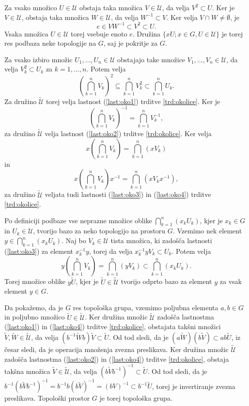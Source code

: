 \documentclass[mat1]{fmfdelo}
\newcommand{\Ucurl}{\mathcal{U}}
\begin{document}
\begin{dokaz}
Za vsako množico $U \in \Ucurl$ obstaja taka množica $V \in \Ucurl$, da velja $V^2 \subset U$. Ker je $V \in \Ucurl$, obstaja taka množica $W \in \Ucurl$, da velja $W^{-1} \subset V$. Ker velja $V \cap W \neq \emptyset$, je
\[ e \in VW^{-1} \subset V^2 \subset U. \]
Vsaka množica $U \in \Ucurl$ torej vsebuje enoto $e$.
Družina $\lbrace xU ; x \in G, U \in \Ucurl \rbrace$ je torej res podbaza neke topologije na $G$, saj je pokritje za $G$.

Za vsako izbiro množic $U_1,\dots,U_n \in \Ucurl$ obstajajo take množice $V_1,\dots,V_n \in \Ucurl$, da velja $V_k^2 \subset U_k$ za $k = 1,\dots,n$. Potem velja
\[ \left( \bigcap_{k=1}^n V_k \right)^2 \subseteq \bigcap_{k=1}^n V_k^2 \subset \bigcap_{k=1}^n U_k. \]
Za družino $\widetilde{\Ucurl}$ torej velja lastnost (\ref{last:oko1}) trditve \ref{trd:okolice}.
Ker je \[\left( \bigcap_{k=1}^n V_k \right)^{-1} = \bigcap_{k=1}^n V_k^{-1},\] za družino $\widetilde{\Ucurl}$ velja lastnost (\ref{last:oko2}) trditve \ref{trd:okolice}.
Ker velja \[x\left(\bigcap_{k=1}^n V_k\right) = \bigcap_{k=1}^n (xV_k)\]
in \[ x\left(\bigcap_{k=1}^n V_k\right)x^{-1} = \bigcap_{k=1}^n (xV_kx^{-1}), \]
za družino $\widetilde{\Ucurl}$ veljata tudi lastnosti (\ref{last:oko3}) in (\ref{last:oko4}) trditve \ref{trd:okolice}.

Po definiciji podbaze vse neprazne množice oblike $\bigcap_{k=1}^n(x_kU_k)$, kjer je $x_k \in G$ in $U_k \in \Ucurl$, tvorijo bazo za neko topologijo na prostoru $G$. Vzemimo nek element $y \in \bigcap_{k=1}^n (x_kU_k)$. Naj bo $V_k \in \Ucurl$ tista množica, ki zadošča lastnosti (\ref{last:oko3}) za element $x_k^{-1}y$, torej da velja $x_k^{-1}yV_k \subset U_k$. Potem velja
\[ y\left(\bigcap_{k=1}^nV_k\right) = \bigcap_{k=1}^n(yV_k) \subset \bigcap_{k=1}^n(x_kU_k). \]
Torej množice oblike $y\widetilde{U}$, kjer je $\widetilde{U} \in \widetilde{\Ucurl}$ tvorijo odprto bazo za element $y$ za vsak element $y \in G$.

Da pokažemo, da je $G$ res topološka grupa, vzemimo poljubna elementa $a,b \in G$ in poljubno množico $\widetilde{U} \in \widetilde{\Ucurl}$. Ker družina množic $\widetilde{\Ucurl}$ zadošča lastnostma (\ref{last:oko1}) in (\ref{last:oko4}) trditve \ref{trd:okolice}, obstajata takšni množici $\widetilde{V}, \widetilde{W} \in \widetilde{\Ucurl}$, da velja $(b^{-1}\widetilde{W}b)\widetilde{V} \subset \widetilde{U}$. Od tod sledi, da je $(a\widetilde{W})(b\widetilde{V}) \subset ab\widetilde{U}$, iz česar sledi, da je operacija množenja zvezna preslikava.
Ker družina množic $\widetilde{\Ucurl}$ zadošča lastnostma (\ref{last:oko2}) in (\ref{last:oko4}) trditve \ref{trd:okolice}, obstaja takšna množica $\widetilde{V} \in \widetilde{\Ucurl}$, da velja $(b\widetilde{V}b^{-1})^{-1} \subset \widetilde{U}$. Od tod sledi, da je $b^{-1}(b\widetilde{V}b^{-1})^{-1} = b^{-1}b (b\widetilde{V})^{-1} = (bV)^{-1} \subset b^{-1}\widetilde{U}$, torej je invertiranje zvezna preslikava. Topološki prostor $G$ je torej topološka grupa.


\end{dokaz}
\end{document}
